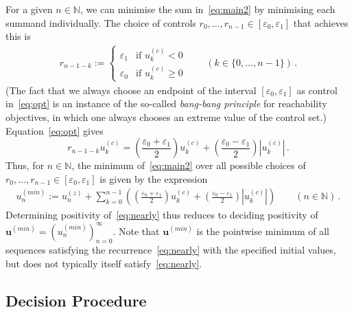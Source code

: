 \documentclass[a4paper,UKenglish,cleveref, autoref, thm-restate]{lipics-v2021}
\begin{document}
For a given $n\in\mathbb N$,
we can minimise the sum in~\eqref{eq:main2} by minimising each summand individually.  
 The choice of controls $r_0,\ldots,r_{n-1}\in
 [\varepsilon_0,\varepsilon_1]$ that achieves this is
\begin{gather}r_{n-1-k}:= \begin{cases} \varepsilon_1 & \text{if $u_k^{(c)}
      <0$}\\
    \varepsilon_0 &  \text{if $u_k^{(c)}
      \geq 0$} \end{cases} \qquad (k\in\{0,\ldots,n-1\}) \, .
\label{eq:opt}
\end{gather}
(The fact that we always choose an endpoint of the interval 
 $[\varepsilon_0,\varepsilon_1]$ as control in~\eqref{eq:opt} is an instance of the 
 so-called \emph{bang-bang principle} for reachability objectives, in which one always chooses an extreme 
 value of the control set.)
Equation~\eqref{eq:opt} gives \[ r_{n-1-k} u^{(c)}_{k}=\left(\frac{\varepsilon_0+\varepsilon_1}{2} \right)u_k^{(c)} +
\left(\frac{\varepsilon_0-\varepsilon_1}{2}\right) |u_k^{(c)}| \, .\]
 Thus, for $n\in \mathbb N$, the minimum of~\eqref{eq:main2} over all possible choices 
of $r_0,\ldots,r_{n-1}\in [\varepsilon_0,\varepsilon_1]$ is given by the expression
\begin{gather}
u^{(min)}_n:= u_n^{(z)} + 
\sum_{k=0}^{n-1} \left(\left(\frac{\varepsilon_0+\varepsilon_1}{2} \right) u_k^{(c)} + \left(\frac{\varepsilon_0-\varepsilon_1}{2}
\right) |u_k^{(c)}| \right)\qquad (n\in\mathbb N) \, .
    \label{eq:master}
\end{gather}
Determining positivity of~\eqref{eq:nearly} thus reduces to deciding positivity of $\boldsymbol u^{(min)}=(u^{(min)}_n)_{n=0}^\infty$.
Note that $\boldsymbol u^{(min)}$ is the pointwise minimum of all sequences satisfying the recurrence~\eqref{eq:nearly} with the specified initial values, but does not typically itself satisfy~\eqref{eq:nearly}.
\subsection{Decision Procedure}
\label{sec:decide}
\end{document}
